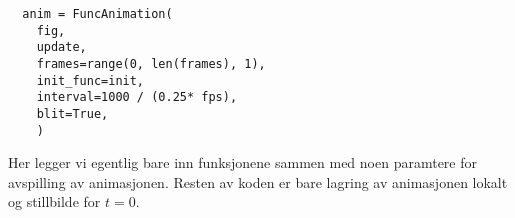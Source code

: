 \begin{lstlisting}
  anim = FuncAnimation(
    fig,
    update,
    frames=range(0, len(frames), 1),
    init_func=init,
    interval=1000 / (0.25* fps),
    blit=True,
    )
\end{lstlisting}

Her legger vi egentlig bare inn funksjonene sammen med noen paramtere for avspilling av animasjonen. Resten av koden er bare lagring av animasjonen lokalt og stillbilde 
for $t=0$.